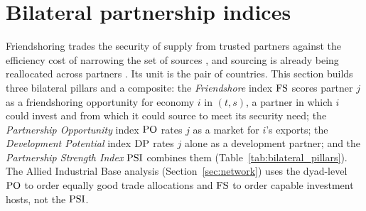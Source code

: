 \section{Bilateral partnership indices}\label{sec:bilateral}

Friendshoring trades the security of supply from trusted partners against the efficiency cost of
narrowing the set of sources \citep{yellen2022remarks,aiyar2023geoeconomic,gopinath2025changing,
javorcik2024economic,grossman2023supply}, and sourcing is already being reallocated across partners
\citep{alfaro2023global,freund2024us}. Its unit is the pair of countries. This section builds three
bilateral pillars and a composite: the
\emph{Friendshore} index $\mathrm{FS}$ scores partner $j$ as a friendshoring opportunity for economy $i$
in $(t,s)$, a partner in which $i$ could invest and from which it could source to meet its security
need; the
\emph{Partnership Opportunity} index $\mathrm{PO}$ rates $j$ as a market for $i$'s exports; the
\emph{Development Potential} index $\mathrm{DP}$ rates $j$ alone as a development partner; and the
\emph{Partnership Strength Index} $\mathrm{PSI}$ combines them (Table~\ref{tab:bilateral_pillars}). The
Allied Industrial Base analysis (Section~\ref{sec:network}) uses the dyad-level $\mathrm{PO}$ to order equally
good trade allocations and $\mathrm{FS}$ to order capable investment hosts, not the $\mathrm{PSI}$.

